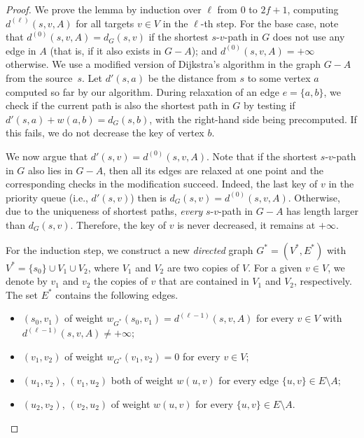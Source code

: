 \documentclass{theoretics}
\begin{document}
\begin{proof}
We prove the lemma by induction over $\ell$ from $0$ to $2f{+}1$,
computing  $d^{(\ell)}(s, v, A)$ for all targets $v \in V$ in the $\ell$-th step.
%
For the base case, 
note that $d^{(0)}(s,v,A) = d_G(s,v)$ if the shortest $s$-$v$-path in $G$
does not use any edge in $A$ (that is, if it also exists in $G-A$);
and $d^{(0)}(s,v,A) = +\infty$ otherwise.
We use a modified version of Dijkstra's algorithm in the graph $G-A$ from the source~$s$.
Let $d'(s, a)$ be the distance from $s$ to some vertex $a$
computed so far by our algorithm.
During relaxation of an edge $e = \{a, b\}$, we check if the current path is also the shortest path in $G$
by testing if $d'(s,a) + w(a, b) = d_G(s,b)$, with the right-hand side being precomputed.
If this fails, we do not decrease the key of vertex $b$.

We now argue that $d'(s,v) = d^{(0)}(s,v,A)$.
Note that if the shortest $s$-$v$-path in $G$ also lies in $G{-}A$,
then all its edges are relaxed at one point 
and the corresponding checks in the modification succeed.
Indeed, the last key of $v$ in the priority queue (i.e., $d'(s,v)$) 
then is $d_{G}(s,v) = d^{(0)}(s,v,A)$.
Otherwise, due to the uniqueness of shortest paths,
\emph{every} $s$-$v$-path in $G-A$ has length larger than $d_G(s,v)$.
Therefore, the key of $v$ is never decreased, it remains at $+\infty$.

For the induction step, we construct a new \emph{directed} graph $G^*= (V^*, E^*)$ with $V^* = \{s_0\} \cup V_1 \cup V_2$, where $V_1$ and $V_2$ are two copies of $V$. 
For a given $v \in V$, we denote by $v_1$ and $v_2$ the copies of $v$ that are contained in $V_1$ and $V_2$, respectively.
The set $E^*$ contains the following edges.
\begin{itemize}
    \item $(s_0,v_1)$ of weight $w_{G^*}(s_0,v_1)=d^{(\ell-1)}(s, v, A)$
    	for every $v \in V$ with $d^{(\ell-1)}(s, v, A) \neq +\infty$;
    \item $(v_1,v_2)$ of weight $w_{G^*}(v_1,v_2)=0$ for every $v \in V$;
    \item $(u_1,v_2)$, $(v_1,u_2)$ both of weight $w(u,v)$ 
    	for every edge $\{u,v\} \in E {\setminus} A$;
    \item $(u_2,v_2)$, $(v_2,u_2)$ of weight $w(u,v)$ for every $\{u,v\} \in E {\setminus} A$.
\end{itemize}


\begin{figure}[t]


\end{figure}
\end{proof}
\end{document}
